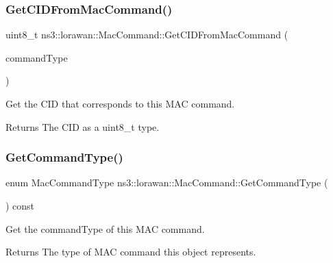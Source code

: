 \subsubsection{\texorpdfstring{Get\+C\+I\+D\+From\+Mac\+Command()}{GetCIDFromMacCommand()}}
{\footnotesize\ttfamily uint8\+\_\+t ns3\+::lorawan\+::\+Mac\+Command\+::\+Get\+C\+I\+D\+From\+Mac\+Command (\begin{DoxyParamCaption}\item[{enum Mac\+Command\+Type}]{command\+Type }\end{DoxyParamCaption})\hspace{0.3cm}{\ttfamily [static]}}

Get the C\+ID that corresponds to this M\+AC command.

\begin{DoxyReturn}{Returns}
The C\+ID as a uint8\+\_\+t type. 
\end{DoxyReturn}
\mbox{\label{classns3_1_1lorawan_1_1MacCommand_a79e55807f698d7c4dd2c2d7a6f20e0e7}} 
\subsubsection{\texorpdfstring{Get\+Command\+Type()}{GetCommandType()}}
{\footnotesize\ttfamily enum Mac\+Command\+Type ns3\+::lorawan\+::\+Mac\+Command\+::\+Get\+Command\+Type (\begin{DoxyParamCaption}\item[{void}]{ }\end{DoxyParamCaption}) const\hspace{0.3cm}{\ttfamily [virtual]}}

Get the command\+Type of this M\+AC command.

\begin{DoxyReturn}{Returns}
The type of M\+AC command this object represents. 
\end{DoxyReturn}
\mbox{\label{classns3_1_1lorawan_1_1MacCommand_a022ce0fc4c97d8f484340a1a18958640}} 
